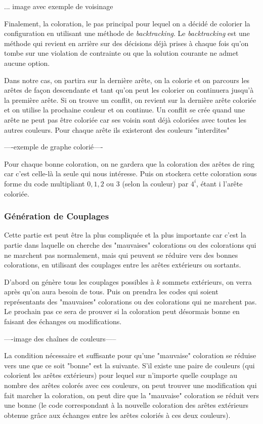 \documentclass[10pt,a4paper]{article}
\begin{document}
... image avec exemple de voisinage

Finalement, la coloration, le pas principal pour lequel on a décidé de colorier la configuration en utilisant une méthode de \emph{backtracking}. Le \emph{backtracking} est une méthode qui revient en arrière sur des décisions déjà prises à chaque fois qu'on tombe sur une violation de contrainte ou que la solution courante ne admet aucune option. 

Dans notre cas, on partira sur la dernière arête, on la colorie et on parcours les arêtes de façon descendante et tant qu'on peut les colorier on continuera jusqu'à la première arête. Si on trouve un conflit, on revient sur la dernière arête coloriée et on utilise la prochaine couleur et on continue. Un conflit se crée quand une arête ne peut pas être coloriée car ses voisin sont déjà coloriées avec toutes les autres couleurs. Pour chaque arête ils existeront des couleurs "interdites" 

----exemple de graphe colorié----

Pour chaque bonne coloration, on ne gardera que la coloration des arêtes de ring car c'est celle-là la seule qui nous intéresse. Puis on stockera cette coloration sous forme du code multipliant $0,1,2$ ou $3$ (selon la couleur) par $4^{i}$, étant i l'arête coloriée.
\subsubsection{Génération de Couplages}

Cette partie est peut être la plus compliquée et la plus importante car c'est la partie dans laquelle on cherche des "mauvaises" colorations ou des colorations qui ne marchent pas normalement, mais qui peuvent se réduire vers des bonnes colorations, en utilisant des couplages entre les arêtes extérieurs ou sortants. 

D'abord on génère tous les couplages possibles à $k$ sommets extérieurs, on verra après qu'on aura besoin de tous. Puis on prendra les codes qui soient représentants des "mauvaises" colorations ou des colorations qui ne marchent pas. Le prochain pas ce sera de prouver si la coloration peut désormais bonne en faisant des échanges ou modifications. 

----image des chaînes de couleurs-----

La condition nécessaire et suffisante pour qu'une "mauvaise" coloration se réduise vers une que ce soit "bonne" est la suivante. S'il existe une paire de couleurs (qui colorient les arêtes extérieurs) pour lequel sur n'importe quelle couplage au nombre des arêtes colorés avec ces couleurs, on peut trouver une modification qui fait marcher la coloration, on peut dire que la "mauvaise" coloration se réduit vers une bonne (le code correspondant à la nouvelle coloration des arêtes extérieurs obtenue grâce aux échanges entre les arêtes coloriés à ces deux couleurs).
\end{document}

